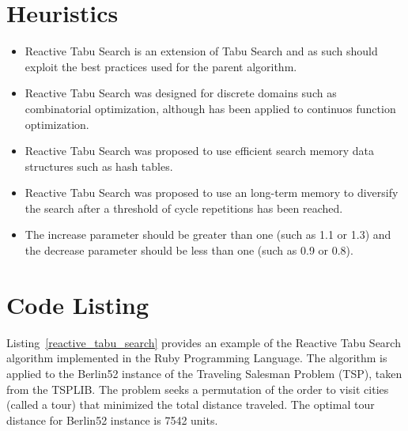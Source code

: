 \documentclass[a4paper, 11pt]{article}
\begin{document}
\section{Heuristics}
\label{sec:heuristics}
\begin{itemize}
	\item Reactive Tabu Search is an extension of Tabu Search and as such should exploit the best practices used for the parent algorithm.
	\item Reactive Tabu Search was designed for discrete domains such as combinatorial optimization, although has been applied to continuos function optimization.
	\item Reactive Tabu Search was proposed to use efficient search memory data structures such as hash tables.
	\item Reactive Tabu Search was proposed to use an long-term memory to diversify the search after a threshold of cycle repetitions has been reached.
	\item The increase parameter should be greater than one (such as 1.1 or 1.3) and the decrease parameter should be less than one (such as 0.9 or 0.8).
\end{itemize}

\section{Code Listing}
\label{sec:code}
Listing~\ref{reactive_tabu_search} provides an example of the Reactive Tabu Search algorithm implemented in the Ruby Programming Language. 
The algorithm is applied to the Berlin52 instance of the Traveling Salesman Problem (TSP), taken from the TSPLIB. The problem seeks a permutation of the order to visit cities (called a tour) that minimized the total distance traveled. The optimal tour distance for Berlin52 instance is 7542 units.
\end{document}
